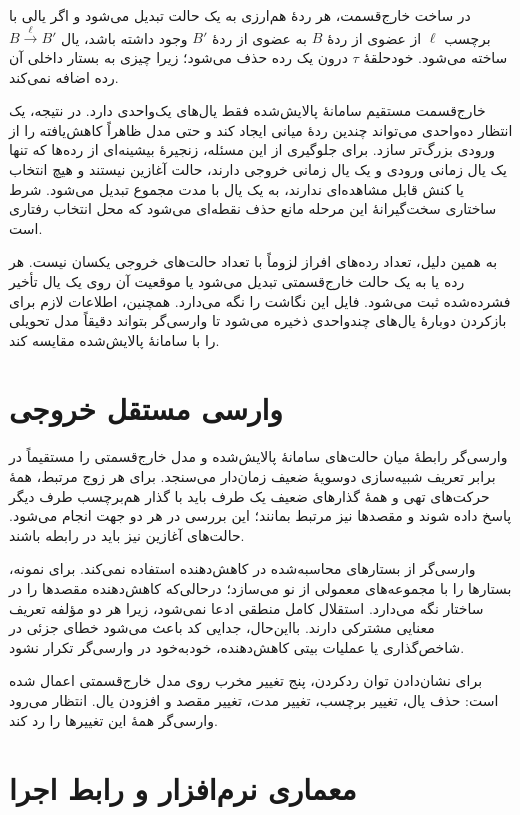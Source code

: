 در ساخت خارج‌قسمت، هر ردهٔ هم‌ارزی به یک حالت تبدیل می‌شود و اگر یالی با برچسب $\ell$ از عضوی از ردهٔ $B$ به عضوی از ردهٔ $B'$ وجود داشته باشد، یال $B\xrightarrow{\ell}B'$ ساخته می‌شود. خودحلقهٔ $\tau$ درون یک رده حذف می‌شود؛ زیرا چیزی به بستار داخلی آن رده اضافه نمی‌کند.

خارج‌قسمت مستقیم سامانهٔ پالایش‌شده فقط یال‌های یک‌واحدی دارد. در نتیجه، یک انتظار ده‌واحدی می‌تواند چندین ردهٔ میانی ایجاد کند و حتی مدل ظاهراً کاهش‌یافته را از ورودی بزرگ‌تر سازد. برای جلوگیری از این مسئله، زنجیرهٔ بیشینه‌ای از رده‌ها که تنها یک یال زمانی ورودی و یک یال زمانی خروجی دارند، حالت آغازین نیستند و هیچ انتخاب یا کنش قابل مشاهده‌ای ندارند، به یک یال با مدت مجموع تبدیل می‌شود. شرط ساختاری سخت‌گیرانهٔ این مرحله مانع حذف نقطه‌ای می‌شود که محل انتخاب رفتاری است.

به همین دلیل، تعداد رده‌های افراز لزوماً با تعداد حالت‌های خروجی یکسان نیست. هر رده یا به یک حالت خارج‌قسمتی تبدیل می‌شود یا موقعیت آن روی یک یال تأخیر فشرده‌شده ثبت می‌شود. فایل  این نگاشت را نگه می‌دارد. همچنین، اطلاعات لازم برای بازکردن دوبارهٔ یال‌های چندواحدی ذخیره می‌شود تا وارسی‌گر بتواند دقیقاً مدل تحویلی را با سامانهٔ پالایش‌شده مقایسه کند.

\section{وارسی مستقل خروجی}

وارسی‌گر رابطهٔ میان حالت‌های سامانهٔ پالایش‌شده و مدل خارج‌قسمتی را مستقیماً در برابر تعریف شبیه‌سازی دوسویهٔ ضعیف زمان‌دار می‌سنجد. برای هر زوج مرتبط، همهٔ حرکت‌های تهی و همهٔ گذارهای ضعیف یک طرف باید با گذار هم‌برچسب طرف دیگر پاسخ داده شوند و مقصدها نیز مرتبط بمانند؛ این بررسی در هر دو جهت انجام می‌شود. حالت‌های آغازین نیز باید در رابطه باشند.

وارسی‌گر از بستارهای محاسبه‌شده در کاهش‌دهنده استفاده نمی‌کند. برای نمونه، بستارها را با مجموعه‌های معمولی از نو می‌سازد؛ درحالی‌که کاهش‌دهنده مقصدها را در ساختار  نگه می‌دارد. استقلال کامل منطقی ادعا نمی‌شود، زیرا هر دو مؤلفه تعریف معنایی مشترکی دارند. بااین‌حال، جدایی کد باعث می‌شود خطای جزئی در شاخص‌گذاری یا عملیات بیتی کاهش‌دهنده، خودبه‌خود در وارسی‌گر تکرار نشود.

برای نشان‌دادن توان ردکردن، پنج تغییر مخرب روی مدل خارج‌قسمتی اعمال شده است: حذف یال، تغییر برچسب، تغییر مدت، تغییر مقصد و افزودن یال. انتظار می‌رود وارسی‌گر همهٔ این تغییرها را رد کند.

\section{معماری نرم‌افزار و رابط اجرا}

